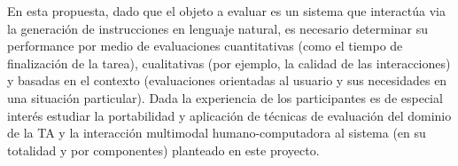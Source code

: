 En esta propuesta, dado que el objeto a evaluar es un sistema que interact\'ua via la generaci\'on de instrucciones en lenguaje natural, es necesario determinar su performance por medio de evaluaciones cuantitativas (como el tiempo de finalizaci\'on de la tarea), cualitativas (por ejemplo, la calidad de las interacciones) y basadas en el contexto (evaluaciones orientadas al usuario y sus necesidades en una situaci\'on particular). Dada la experiencia de los participantes es de especial inter\'es estudiar la  portabilidad y aplicaci\'on de t\'ecnicas de evaluaci\'on del dominio de la TA y la interacci\'on multimodal humano-computadora al sistema (en su totalidad y por componentes) planteado en este proyecto.

